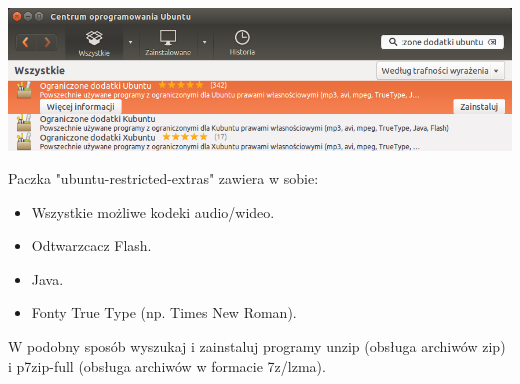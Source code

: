\begin{center}
        \includegraphics[scale=0.95]{images/pierwsze_uruchomienie_dodatki2.png}
\end{center}
Paczka "ubuntu-restricted-extras" zawiera w sobie:
\begin{itemize}
\item Wszystkie możliwe kodeki audio/wideo.
\item Odtwarzcacz Flash.
\item Java.
\item Fonty True Type (np. Times New Roman).
\end{itemize}
W podobny sposób wyszukaj i zainstaluj programy unzip (obsługa archiwów zip) i p7zip-full (obsługa archiwów w formacie 7z/lzma).
\clearpage
